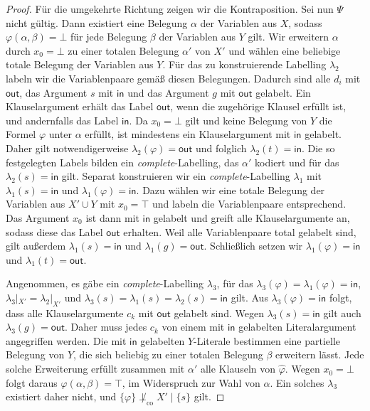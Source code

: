 \begin{proof}
    Für die umgekehrte Richtung zeigen wir die Kontraposition. Sei nun
    \(\Psi\) nicht gültig. Dann existiert eine Belegung
    \(\alpha\) der Variablen aus \(X\), sodass
    \(\varphi(\alpha,\beta)=\bot\) für jede Belegung \(\beta\) der
    Variablen aus \(Y\) gilt.
    Wir erweitern \(\alpha\) durch \(x_0=\bot\) zu einer totalen
    Belegung \(\alpha'\) von \(X'\) und wählen eine beliebige totale
    Belegung der Variablen aus \(Y\). Für das zu konstruierende
    Labelling \(\lambda_2\) labeln wir die Variablenpaare gemäß diesen
    Belegungen. Dadurch sind alle \(d_i\) mit \(\mathsf{out}\), das Argument
    \(s\) mit \(\mathsf{in}\) und das Argument \(g\) mit \(\mathsf{out}\) gelabelt. Ein
    Klauselargument erhält das Label \(\mathsf{out}\), wenn die zugehörige
    Klausel erfüllt ist, und andernfalls das Label \(\mathsf{in}\). Da
    \(x_0=\bot\) gilt und keine Belegung von \(Y\) die Formel
    \(\varphi\) unter \(\alpha\) erfüllt, ist mindestens ein
    Klauselargument mit \(\mathsf{in}\) gelabelt. Daher gilt notwendigerweise
    \(\lambda_2(\varphi)=\mathsf{out}\) und folglich \(\lambda_2(t)=\mathsf{in}\).
    Die so festgelegten Labels bilden ein \emph{complete}-Labelling,
    das \(\alpha'\) kodiert und für das \(\lambda_2(s)=\mathsf{in}\) gilt.
    Separat konstruieren wir ein \emph{complete}-Labelling \(\lambda_1\)
    mit \(\lambda_1(s)=\mathsf{in}\) und \(\lambda_1(\varphi)=\mathsf{in}\). Dazu wählen
    wir eine totale Belegung der Variablen aus \(X'\cup Y\) mit
    \(x_0=\top\) und labeln die Variablenpaare entsprechend. Das
    Argument \(x_0\) ist dann mit \(\mathsf{in}\) gelabelt und greift alle
    Klauselargumente an, sodass diese das Label \(\mathsf{out}\) erhalten. Weil
    alle Variablenpaare total gelabelt sind, gilt außerdem
    \(\lambda_1(s)=\mathsf{in}\) und \(\lambda_1(g)=\mathsf{out}\). Schließlich setzen
    wir \(\lambda_1(\varphi)=\mathsf{in}\) und \(\lambda_1(t)=\mathsf{out}\).

    Angenommen, es gäbe ein \emph{complete}-Labelling \(\lambda_3\),
    für das \(\lambda_3(\varphi)=\lambda_1(\varphi)=\mathsf{in}\),
    \(\lambda_3|_{X'}=\lambda_2|_{X'}\) und
    \(\lambda_3(s)=\lambda_1(s)=\lambda_2(s)=\mathsf{in}\) gilt. Aus
    \(\lambda_3(\varphi)=\mathsf{in}\) folgt, dass alle Klauselargumente \(c_k\)
    mit \(\mathsf{out}\) gelabelt sind. Wegen \(\lambda_3(s)=\mathsf{in}\) gilt auch
    \(\lambda_3(g)=\mathsf{out}\). Daher muss
    jedes \(c_k\) von einem mit \(\mathsf{in}\) gelabelten Literalargument
    angegriffen werden. Die mit \(\mathsf{in}\) gelabelten \(Y\)-Literale
    bestimmen eine partielle Belegung von \(Y\), die sich beliebig zu
    einer totalen Belegung \(\beta\) erweitern lässt. Jede solche
    Erweiterung erfüllt zusammen mit \(\alpha'\) alle Klauseln von
    \(\widehat{\varphi}\). Wegen \(x_0=\bot\) folgt daraus
    \(\varphi(\alpha,\beta)=\top\), im Widerspruch zur Wahl von
    \(\alpha\). Ein solches \(\lambda_3\) existiert daher nicht, und
    \(\{\varphi\}\not\perp_{\mathrm{co}}X'\mid\{s\}\) gilt.


\end{proof}
